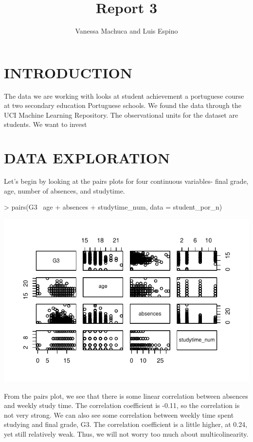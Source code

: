 \documentclass{article}
\title{Report 3}
\author{Vanessa Machuca and Luis Espino}
\begin{document}

\maketitle

\section{INTRODUCTION}

The data we are working with looks at student achievement a portuguese course at two secondary education Portuguese schools. We found the data through the UCI Machine Learning Repository. The observational units for the dataset are students. We want to invest



\section{DATA EXPLORATION}
Let's begin by looking at the pairs plots for four continuous variables- final grade, age, number of absences, and studytime. 

\begin{Schunk}
\begin{Sinput}
> pairs(G3~ age + absences + studytime_num, data = student_por_n)
\end{Sinput}
\end{Schunk}
\includegraphics{Report_3-003}



From the pairs plot, we see that there is some linear correlation between absences and weekly study time. The correlation coefficient is -0.11, so the correlation is not very strong. We can also see some correlation between weekly time spent studying and final grade, G3. The correlation coefficient is a little higher, at 0.24, yet still relatively weak. Thus, we will not worry too much about multicolinearity.
\end{document}
